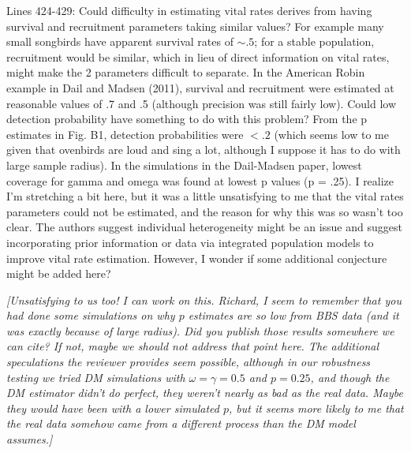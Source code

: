 \documentclass[12pt,english]{article}
\begin{document}
\begin{spacing}{1.9}
\begin{flushleft}
Lines 424-429: Could difficulty in estimating vital rates derives from having
survival and recruitment parameters taking similar values? For example many
small songbirds have apparent survival rates of $\sim .5$; for a stable population,
recruitment would be similar, which in lieu of direct information on vital
rates, might make the 2 parameters difficult to separate. In the American Robin
example in Dail and Madsen (2011), survival and recruitment were estimated at
reasonable values of .7 and .5 (although precision was still fairly low). Could
low detection probability have something to do with this problem? From the p
estimates in Fig. B1, detection probabilities were $< .2$ (which seems low to me
given that ovenbirds are loud and sing a lot, although I suppose it has to do
with large sample radius). In the simulations in the Dail-Madsen paper, lowest
coverage for gamma and omega was found at lowest p values (p = .25). I realize
I'm stretching a bit here, but it was a little
unsatisfying to me that the vital rates parameters could not be estimated, and
the reason for why this was so wasn't too clear. The authors suggest individual
heterogeneity might be an issue and suggest incorporating prior information or
data via integrated population models to improve vital rate estimation. However,
I wonder if some additional conjecture might be added here?

\vspace{0.5cm}
\textit{[Unsatisfying to us too!  I can work on this.  Richard, I seem to remember that 
you had done some simulations on why $p$ estimates are so low from BBS data 
(and it was exactly because of large radius).  Did you publish those results somewhere
we can cite?  If not, maybe we should not address that point here.
The additional speculations
the reviewer provides seem possible, although in our robustness testing we tried
DM simulations with $\omega = \gamma = 0.5$ and $p = 0.25$, and though the DM
estimator didn't do perfect, they weren't nearly as bad as the real data.  Maybe 
they would have been with a lower simulated $p$, but it seems more likely to me that
the real data somehow came from a different process than the DM model assumes.]}
\vspace{0.5cm}




\end{flushleft}
\end{spacing}
\end{document}
